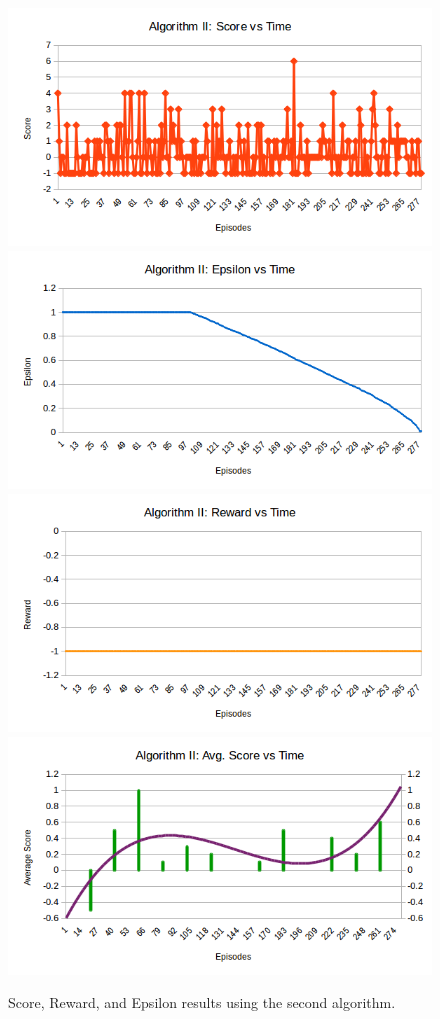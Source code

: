 \documentclass{article}
\begin{document}
\begin{enumerate}
    \begin{figure}[H]
        \centering
        \includegraphics[width=.8\textwidth]{Algorithm2_score.png}\hfill
        \includegraphics[width=.8\textwidth]{Algorithm2_epsilon.png}\hfill 
        \includegraphics[width=.8\textwidth]{Algorithm2_reward.png}\hfill 
        \includegraphics[width=.8\textwidth]{Algorithm2_Avgscore.png}\hfill 
        \caption{Score, Reward, and Epsilon results using the second algorithm.}
    \end{figure}
    

\end{enumerate}
\end{document}
